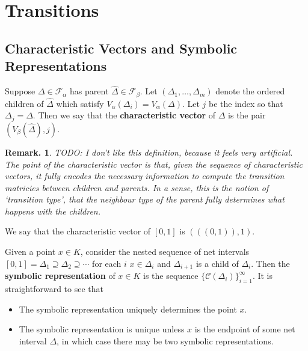 \documentclass[11pt, a4paper]{memoir}
\theoremstyle{change}
\theoremstyle{plain}
\theoremstyle{nonumberplain}
\newtheorem{remark}{Remark.}
\numberwithin{equation}{section}
\begin{document}
\section{Transitions}
\subsection{Characteristic Vectors and Symbolic Representations}
Suppose $\Delta\in\mathcal{F}_\alpha$ has parent $\widehat\Delta\in\mathcal{F}_\beta$.
Let $(\Delta_1,\ldots,\Delta_m)$ denote the ordered children of $\widehat\Delta$ which satisfy $V_\alpha(\Delta_i)=V_\alpha(\Delta)$.
Let $j$ be the index so that $\Delta_{j}=\Delta$.
Then we say that the \textbf{characteristic vector} of $\Delta$ is the pair $(V_\beta(\widehat\Delta),j)$.
\begin{remark}
    TODO: I don't like this definition, because it feels very artificial.
    The point of the characteristic vector is that, given the sequence of characteristic vectors, it fully encodes the necessary information to compute the transition matricies between children and parents.
    In a sense, this is the notion of `transition type', that the neighbour type of the parent fully determines what happens with the children.
\end{remark}
We say that the characteristic vector of $[0,1]$ is $(((0,1)),1)$.

Given a point $x\in K$, consider the nested sequence of net intervals $[0,1]=\Delta_1\supseteq\Delta_2\supseteq\cdots$ for each $i$ $x\in\Delta_i$ and $\Delta_{i+1}$ is a child of $\Delta_i$.
Then the \textbf{symbolic representation} of $x\in K$ is the sequence $\{\mathcal{C}(\Delta_i)\}_{i=1}^\infty$.
It is straightforward to see that
\begin{itemize}[nl]
    \item The symbolic representation uniquely determines the point $x$.
    \item The symbolic representation is unique unless $x$ is the endpoint of some net interval $\Delta$, in which case there may be two symbolic representations.
\end{itemize}
\end{document}
